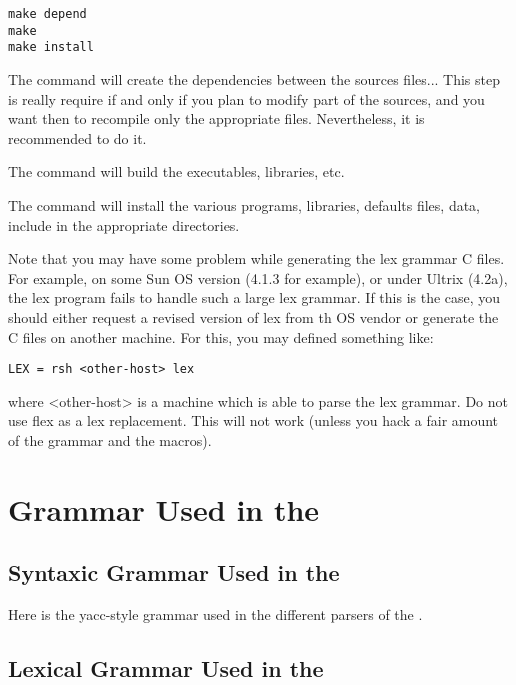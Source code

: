 \begin{verbatim}
make depend
make
make install
\end{verbatim}

The  command will create the dependencies between the
sources files... This step is really require if and only if you plan to
modify part of the sources, and you want then to recompile only the
appropriate files. Nevertheless, it is recommended to do it.

The  command will build the executables, libraries, etc.

The  command will install the various programs,
libraries, defaults files, data, include in the appropriate directories.

Note that you may have some problem while generating the lex grammar C
files. For example, on some Sun OS version (4.1.3 for example), or under Ultrix
(4.2a), the lex program fails to handle such a large lex grammar. If this is
the case, you should either request a revised version of lex from th OS vendor
or generate the C files on another machine. For this, you may defined something
like:

\begin{verbatim}
LEX = rsh <other-host> lex
\end{verbatim}

where <other-host> is a machine which is able to parse the \COPRS{} lex grammar.
Do not use flex as a lex replacement. This will not work (unless you hack a
fair amount of the grammar and the macros).

\chapter{Grammar Used in the \COPRSDE{}}



\section{Syntaxic Grammar Used in the \COPRSDE{}}

Here is the yacc-style grammar used in the different parsers of the
\COPRSDE{}.


\section{Lexical Grammar Used in the \COPRSDE{}}

